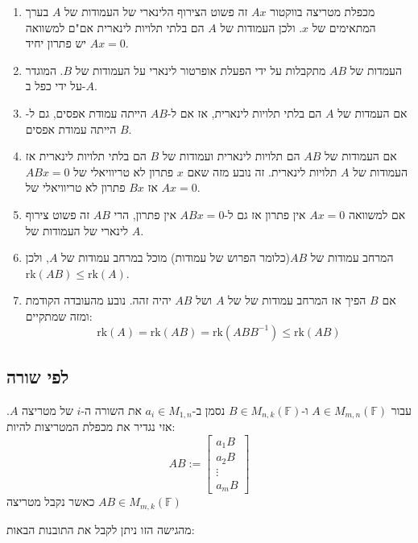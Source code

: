 \documentclass{tstextbook}
\begin{document}
\begin{enumerate}
  \item מכפלת מטריצה בווקטור \(Ax\) זה פשוט הצירוף הלינארי של העמודות של \(A\) בערך המתאימים של \(x\). ולכן העמודות של \(A\) הם בלתי תלויות לינארית אם"ם למשוואה \(Ax=0\) יש פתרון יחיד. 


  \item העמדות של \(AB\) מתקבלות על ידי הפעלת אופרטור לינארי על העמודות של \(B\). המוגדר על ידי כפל ב-\(A\). 


  \item אם העמדות של \(A\) הם בלתי תלויות לינארית, אז אם ל-\(AB\) הייתה עמודת אפסים, גם ל-\(B\) הייתה עמודת אפסים. 


  \item אם העמודות של \(AB\) הם תלויות לינארית ועמודות של \(B\) הם בלתי תלויות לינארית אז העמודות של \(A\) תלויות לינארית. זה נובע מזה שאם \(x\) פתרון לא טריוויאלי של \(ABx=0\) אז \(Bx\) פתרון לא טריוויאלי של \(Ax=0\). 


  \item אם למשוואה \(Ax=0\) אין פתרון אז גם ל-\(ABx=0\) אין פתרון, הרי \(AB\) זה פשוט צירוף לינארי של העמודות של \(A\). 


  \item המרחב עמודות של \(AB\)(כלומר הפרוש של עמודות) מוכל במרחב עמודות של \(A\), ולכן \(\mathrm{rk}(AB)\leq \mathrm{rk}(A)\). 


  \item אם \(B\) הפיך אז המרחב עמודות של של \(A\) ושל \(AB\) יהיה זהה. נובע מהעובדה הקודמת ומזה שמתקיים: 
$$\mathrm{rk}(A)=\mathrm{rk}(AB)=\mathrm{rk}(ABB^{-1})\leq\mathrm{rk}(AB)$$


\end{enumerate}
\subsection{לפי שורה}

\begin{definition}
עבור \(A \in M_{m,n}\left( \mathbb{F}  \right)\) ו-\(B \in M_{n,k}\left( \mathbb{F}  \right)\) נסמן ב-\(a_{i}\in M_{1,n}\) את השורה ה-\(i\) של מטריצה \(A\). אזי נגדיר את מכפלת המטריצות להיות:
$$A B:=\begin{bmatrix}a_{1}B\\ a_{2} B\\ \vdots \\a_{m}B
\end{bmatrix}$$
כאשר נקבל מטריצה \(AB \in M_{m,k}\left( \mathbb{F}  \right)\)

\end{definition}
מהגישה הזו ניתן לקבל את התובנות הבאות:
\end{document}
